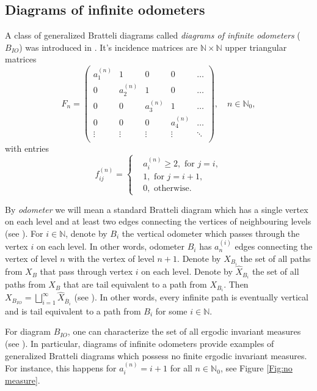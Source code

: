 \documentclass[11pt, twoside]{amsart}
\theoremstyle{definition}
\theoremstyle{remark}
\theoremstyle{plain}
\def\ov{\overline}
\def\wh{\widehat}
\newcommand{\N}{\mathbb N}
\numberwithin{equation}{section}
\begin{document}
\subsection{Diagrams of infinite odometers}\label{subsec:DIO}
A class of generalized Bratteli diagrams called \textit{diagrams of infinite odometers} ($B_{IO}$) was introduced in \cite[Section 4]{BezuglyiKarpelKwiatkowski2024}. It's incidence matrices are $\N \times \N$ upper triangular matrices
$$
{F}_{n} =
\begin{pmatrix}
 a_{1}^{(n)} &     1 &      0 &      0 & \ldots  \\
     0 &  a_{2}^{(n)} &      1 &      0 &      \ldots  \\
     0 &      0 &  a_{3}^{(n)} &      1 &      \ldots  \\
     0 &      0 &      0 &  a_{4}^{(n)} &      \ldots  \\
\vdots & \vdots & \vdots & \vdots & \ddots \\
\end{pmatrix}, \quad n \in \N_0,
$$
with entries
$$
f_{ij}^{(n)} = 
\left\{
\begin{aligned}
& a_{i}^{(n)} \geq 2, \mbox{ for } j = i,\\
& 1, \mbox{ for } j = i + 1,\\
& 0, \mbox{ otherwise. }
\end{aligned}
\right.
$$


By \textit{odometer} we will mean a standard Bratteli diagram which has a single vertex on each level and at least two edges connecting the vertices of neighbouring levels (see \cite[Subsection 6.5.1]{Durand2010}). For $i \in \N$, denote by $B_i$ the vertical odometer which passes through the vertex $i$ on each level. In other words, odometer $B_i$ has $a_n^{(i)}$ edges connecting the vertex of level $n$ with the vertex of level $n + 1$. Denote by $X_{B_i}$ the set of all paths from $X_B$ that pass through vertex $i$ on each level. Denote by $\wh {X}_{B_i}$ the set of all paths from $X_B$ that are tail equivalent to a path from $X_{B_i}$. Then $X_{B_{IO}} = \bigsqcup_{i = 1}^{\infty}\wh X_{\ov B_i}$ (see \cite[Proposition 4.1]{BezuglyiKarpelKwiatkowski2024}). In other words, every infinite path is eventually vertical and is tail equivalent to a path from $B_i$ for some $i \in \N$.


For diagram $B_{IO}$, one can characterize the set of all ergodic invariant measures (see \cite[Theorem 4.3]{BezuglyiKarpelKwiatkowski2024}). In particular, diagrams of infinite odometers provide examples of generalized Bratteli diagrams which possess no finite ergodic invariant measures. For instance, this happens for $a_{i}^{(n)} = i + 1$ for all $n \in \N_0$, see Figure \ref{Fig:no measure}.
\end{document}
